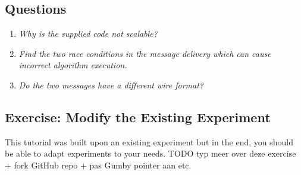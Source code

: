 \documentclass{article}
\begin{document}
\subsection{Questions}
\begin{enumerate}
\item \textit{Why is the supplied code not scalable?}
\item \textit{Find the two race conditions in the message delivery which can cause incorrect algorithm execution.}
\item \textit{Do the two messages have a different wire format?}
\end{enumerate}

\subsection{Exercise: Modify the Existing Experiment}

This tutorial was built upon an existing experiment but in the end, you should be able to adapt experiments to your needs.
TODO typ meer over deze exercise + fork GitHub repo + pas Gumby pointer aan etc.


{\small }
\end{document}
